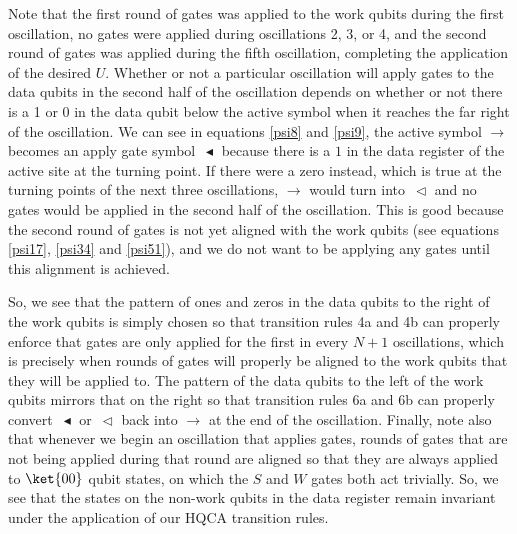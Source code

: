 \documentclass[11pt,letterpaper]{article}
\newcommand{\<}{\langle}
\renewcommand{\>}{\rangle}
\newcommand{\gat}{\,\blacktriangleleft}  %
\newcommand{\mov}{\,\vartriangleleft}    %
\begin{document}
Note that the first round of gates was applied to the work qubits during the first oscillation, no gates were applied during oscillations 2, 3, or 4, and the second round of gates was applied during the fifth oscillation, completing the application of the desired $U$. Whether or not a particular oscillation will apply gates to the data qubits in the second half of the oscillation depends on whether or not there is a 1 or 0 in the data qubit below the active symbol when it reaches the far right of the oscillation. We can see in equations \ref{psi8} and \ref{psi9}, the active symbol $\rightarrow$ becomes an apply gate symbol $\gat$ because there is a $1$ in the data register of the active site at the turning point. If there were a zero instead, which is true at the turning points of the next three oscillations, $\rightarrow$ would turn into $\mov$ and no gates would be applied in the second half of the oscillation. This is good because the second round of gates is not yet aligned with the work qubits (see equations \ref{psi17}, \ref{psi34} and \ref{psi51}), and we do not want to be applying any gates until this alignment is achieved. 

So, we see that the pattern of ones and zeros in the data qubits to the right of the work qubits is simply chosen so that transition rules 4a and 4b can properly enforce that gates are only applied for the first in every $N+1$ oscillations, which is precisely when rounds of gates will properly be aligned to the work qubits that they will be applied to. The pattern of the data qubits to the left of the work qubits mirrors that on the right so that transition rules 6a and 6b can properly convert $\gat$ or $\mov$ back into $\rightarrow$ at the end of the oscillation. Finally, note also that whenever we begin an oscillation that applies gates, rounds of gates that are not being applied during that round are aligned so that they are always applied to $\ket{00}$ qubit states, on which the $S$ and $W$ gates both act trivially. So, we see that the states on the non-work qubits in the data register remain invariant under the application of our HQCA transition rules.

\end{document}
